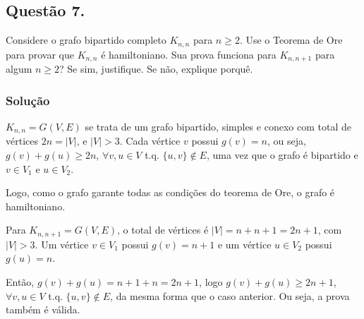 \documentclass[12pt, letterpaper]{report}
\newcounter{ProblemNum}
\newcommand*{\anyproblem}[1]{\newpage\subsection*{#1}}
\newcommand*{\problem}[1]{\stepcounter{ProblemNum} %
   \anyproblem{Questão #1}}
\newcommand*{\soln}[1]{\subsubsection*{#1}}
\newcommand*{\solution}{\soln{Solução}}
\begin{document}
\problem{7.}
  Considere o grafo bipartido completo $ K_{n,n} $ para $ n\ge 2 $. Use o Teorema de Ore para provar que $ K_{n,n} $ é hamiltoniano. Sua prova  funciona para $ K_{n,n+1} $ para algum $ n\ge 2 $? Se sim, justifique. Se não, explique porquê.

\solution
  $K_{n, n} = G(V, E)$ se trata de um grafo bipartido, simples e conexo com total de vértices $2n = |V|$, e $|V| > 3$. Cada vértice $v$ possui $g(v) = n$, ou seja, $g(v) + g(u) \geq 2n$, $\forall v, u \in V$ t.q. $\{u, v\} \not \in E$, uma vez que o grafo é bipartido e $v \in V_1$ e $u \in V_2$.

  Logo, como o grafo garante todas as condições do teorema de Ore, o grafo é hamiltoniano.

  Para $K_{n, n+1} = G(V, E)$, o total de vértices é $|V| = n + n + 1 = 2n + 1$, com $|V| > 3$. Um vértice $v \in V_1$ possui $g(v) = n + 1$ e um vértice $u \in V_2$ possui $g(u) = n$. 

  Então, $g(v) + g(u) = n + 1 + n = 2n + 1$, logo $g(v) + g(u) \geq 2n + 1$, $\forall v, u \in V$ t.q. $\{u, v\} \not \in E$, da mesma forma que o caso anterior. Ou seja, a prova também é válida.
\end{document}
